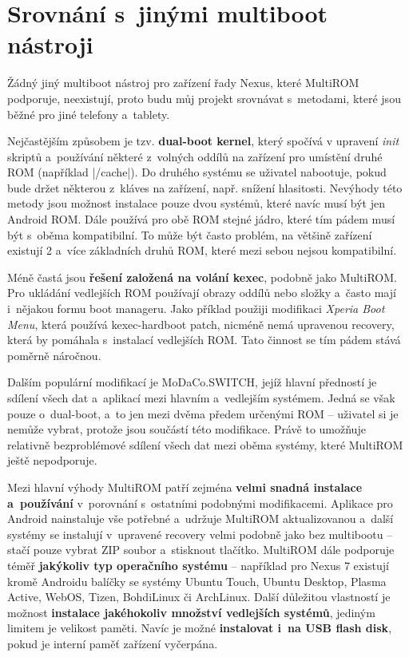 \documentclass[12pt, a4paper, oneside]{article}
\newcommand{\B}{\textbf} %
\newcommand{\It}{\textit}  %
\begin{document}
\linespread{1.3}

\section{Srovnání s~jinými multiboot nástroji}
Žádný jiný multiboot nástroj pro zařízení řady Nexus, které MultiROM podporuje, neexistují, proto budu můj projekt srovnávat s~metodami, které jsou běžné pro jiné telefony a~tablety.

Nejčastějším způsobem je tzv. \B{dual-boot kernel}, který spočívá v upravení \It{init} skriptů a~používání některé z~volných oddílů na zařízení pro umístění druhé ROM (například |/cache|). Do druhého systému se uživatel nabootuje, pokud bude držet některou z~kláves na zařízení, např. snížení hlasitosti. Nevýhody této metody jsou možnost instalace pouze dvou systémů, které navíc musí být jen Android ROM. Dále používá pro obě ROM stejné jádro, které tím pádem musí být s~oběma kompatibilní. To může být často problém, na většině zařízení existují 2 a~více základních druhů ROM, které mezi sebou nejsou kompatibilní.

Méně častá jsou \B{řešení založená na volání kexec}, podobně jako MultiROM. Pro ukládání vedlejších ROM používají obrazy oddílů nebo složky a~často mají i~nějakou formu boot manageru. Jako příklad použiji modifikaci \It{Xperia Boot Menu}\cite{xperia-boot-menu}, která používá kexec-hardboot patch, nicméně nemá upravenou recovery, která by pomáhala s~instalací vedlejších ROM. Tato činnost se tím pádem stává poměrně náročnou.

Dalším populární modifikací je MoDaCo.SWITCH\cite{modaco-switch}, jejíž hlavní předností je sdílení všech dat a~aplikací mezi hlavním a~vedlejším systémem. Jedná se však pouze o~dual-boot, a~to jen mezi dvěma předem určenými ROM -- uživatel si je nemůže vybrat, protože jsou součástí této modifikace. Právě to umožňuje relativně bezproblémové sdílení všech dat mezi oběma systémy, které MultiROM ještě nepodporuje.

Mezi hlavní výhody MultiROM patří zejména \B{velmi snadná instalace a~používání} v~porovnání s~ostatními podobnými modifikacemi. Aplikace pro Android nainstaluje vše potřebné a~udržuje MultiROM aktualizovanou a~další systémy se instalují v~upravené recovery velmi podobně jako bez multibootu -- stačí pouze vybrat ZIP soubor a~stisknout tlačítko. MultiROM dále podporuje téměř \B{jakýkoliv typ operačního systému} -- například pro Nexus 7 existují kromě Androidu balíčky se systémy Ubuntu Touch, Ubuntu Desktop, Plasma Active, WebOS, Tizen, BohdiLinux či ArchLinux. Další důležitou vlastností je možnost \B{instalace jakéhokoliv množství vedlejších systémů}, jediným limitem je velikost paměti. Navíc je možné \B{instalovat i~na USB flash disk}, pokud je interní paměť zařízení vyčerpána.
\end{document}
